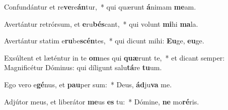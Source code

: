 \item Confundántur et re\textbf{ve}re\textbf{án}tur,~* qui quærunt \textbf{á}nimam \textbf{me}am.
\item Avertántur retrórsum, et \textbf{e}ru\textbf{bés}cant,~* qui volunt \textbf{mi}hi \textbf{ma}la.
\item Avertántur statim e\textbf{ru}be\textbf{scén}tes,~* qui dicunt mihi: \textbf{Eu}ge, \textbf{eu}ge.
\item Exsúltent et læténtur in te \textbf{om}nes qui \textbf{quæ}runt te,~* et dicant semper: Magnificétur Dóminus: qui díligunt salu\textbf{tá}re \textbf{tu}um.
\item Ego vero e\textbf{gé}nus, et \textbf{pau}per sum:~* Deus, \textbf{ád}ju\textbf{va} me.
\item Adjútor meus, et liberátor \textbf{me}us \textbf{es} tu:~* Dómine, \textbf{ne} mo\textbf{ré}ris.
